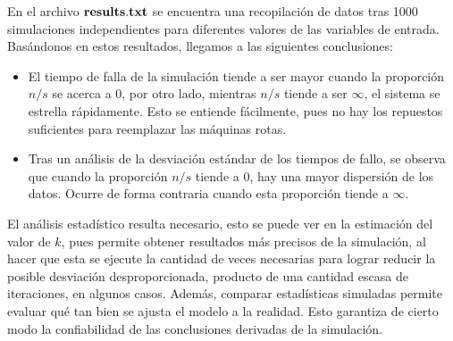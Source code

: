 \documentclass[12pt]{article}
\begin{document}
En el archivo $\bold{results.txt}$ se encuentra una recopilación de datos tras 1000 simulaciones independientes
para diferentes valores de las variables de entrada.
Basándonos en estos resultados, llegamos a las siguientes conclusiones:
\begin{itemize}
  \item El tiempo de falla de la simulación tiende a ser mayor cuando la proporción $n/s$ se acerca a 0, por otro lado, mientras
   $n/s$ tiende a ser $\infty$, el sistema se estrella rápidamente. Esto se entiende fácilmente, pues no hay los repuestos suficientes
   para reemplazar las máquinas rotas.
  \item Tras un análisis de la desviación estándar de los tiempos de fallo, se observa que cuando la proporción
  $n/s$ tiende a 0, hay una mayor dispersión de los datos. Ocurre de forma contraria cuando esta proporción tiende a $\infty$.
\end{itemize}

El análisis estadístico resulta necesario, esto se puede ver en la estimación del valor de $k$, pues permite obtener resultados 
más precisos de la simulación, al hacer que esta se ejecute la cantidad de veces necesarias para lograr reducir la posible desviación 
desproporcionada, producto de una cantidad escasa de iteraciones, en algunos casos. Además, comparar estadísticas simuladas permite evaluar
qué tan bien se ajusta el modelo a la realidad. Esto garantiza de cierto modo la confiabilidad de las conclusiones derivadas de la simulación.
\end{document}
